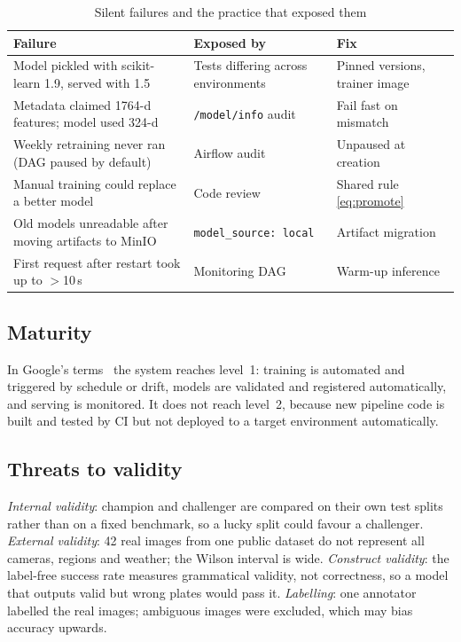 \documentclass[conference]{IEEEtran}
\newcommand{\code}[1]{\texttt{#1}}
\begin{document}
\begin{table}[t]
\centering
\caption{Silent failures and the practice that exposed them}
\label{tab:lessons}
\setlength{\tabcolsep}{3pt}
\footnotesize
\begin{tabular}{@{}L{3.2cm}L{2.2cm}L{2.4cm}@{}}
\toprule
Failure & Exposed by & Fix \\
\midrule
Model pickled with scikit-learn 1.9, served with 1.5 & Tests differing across environments & Pinned versions, trainer image \\
Metadata claimed 1764-d features; model used 324-d & \code{/model/info} audit & Fail fast on mismatch \\
Weekly retraining never ran (DAG paused by default) & Airflow audit & Unpaused at creation \\
Manual training could replace a better model & Code review & Shared rule \eqref{eq:promote} \\
Old models unreadable after moving artifacts to MinIO & \code{model\_source: local} & Artifact migration \\
First request after restart took up to $>$10\,s & Monitoring DAG & Warm-up inference \\
\bottomrule
\end{tabular}
\end{table}

\subsection{Maturity}
In Google's terms~\cite{google2020mlops} the system reaches level~1: training is
automated and triggered by schedule or drift, models are validated and
registered automatically, and serving is monitored. It does not reach level~2,
because new pipeline code is built and tested by CI but not deployed to a target
environment automatically.

\subsection{Threats to validity}
\emph{Internal validity}: champion and challenger are compared on their own test
splits rather than on a fixed benchmark, so a lucky split could favour a
challenger. \emph{External validity}: 42 real images from one public dataset do
not represent all cameras, regions and weather; the Wilson interval is wide.
\emph{Construct validity}: the label-free success rate measures grammatical
validity, not correctness, so a model that outputs valid but wrong plates would
pass it. \emph{Labelling}: one annotator labelled the real images; ambiguous images
were excluded, which may bias accuracy upwards.
\end{document}
